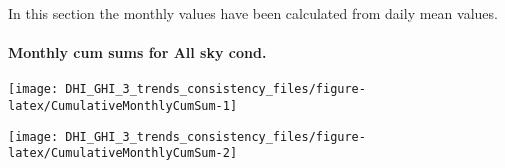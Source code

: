\documentclass[
  10pt,
  a4paper,oneside]{article}
\begin{document}
In this section the monthly values have been calculated from daily mean values.

\newpage

\hypertarget{monthly-cum-sums-for-all-sky-cond.}{%
\paragraph{Monthly cum sums for All sky cond.}\label{monthly-cum-sums-for-all-sky-cond.}}

\begin{center}\texttt{[image: DHI\_GHI\_3\_trends\_consistency\_files/figure-latex/CumulativeMonthlyCumSum-1]} \end{center}

\begin{center}\texttt{[image: DHI\_GHI\_3\_trends\_consistency\_files/figure-latex/CumulativeMonthlyCumSum-2]} \end{center}

\newpage

\footnotesize
\end{document}
